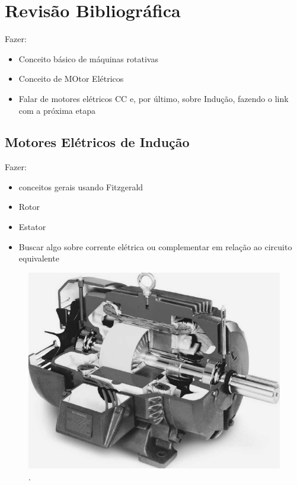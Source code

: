 
\chapter{Revisão Bibliográfica}

Fazer:
\begin{itemize}
    \item Conceito básico de máquinas rotativas
    \item Conceito de MOtor Elétricos
    \item Falar de motores elétricos CC e, por último, sobre Indução, fazendo o link com a próxima etapa
\end{itemize}

% 

\section{Motores Elétricos de Indução}\label{sec:}

Fazer:
\begin{itemize}
    \item conceitos gerais usando Fitzgerald
    \item Rotor
    \item Estator
    \item Buscar algo sobre corrente elétrica ou complementar em relação ao circuito equivalente
\end{itemize}

\begin{figure}[H]
    \caption{.}
    \begin{center}
        \includegraphics[scale=.45]{referencial/img/motor_fitzgerald_p345.png}
    \end{center}
    \label{fig:}
\end{figure}


